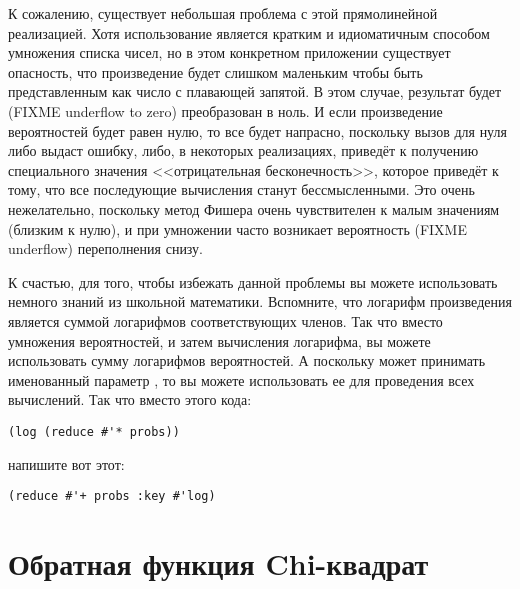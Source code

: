 К сожалению, существует небольшая проблема с этой прямолинейной реализацией.  Хотя
использование  является кратким и идиоматичным способом умножения списка
чисел, но в этом конкретном приложении существует опасность, что произведение будет
слишком маленьким чтобы быть представленным как число с плавающей запятой. В этом случае,
результат будет (FIXME underflow to zero) преобразован в ноль.  И если произведение
вероятностей будет равен нулю, то все будет напрасно, поскольку вызов  для нуля
либо выдаст ошибку, либо, в некоторых реализациях, приведёт к получению специального
значения <<отрицательная бесконечность>>, которое приведёт к тому, что все последующие
вычисления станут бессмысленными.  Это очень нежелательно, поскольку метод Фишера очень
чувствителен к малым значениям (близким к нулю), и при умножении часто возникает
вероятность (FIXME underflow) переполнения снизу.

К счастью, для того, чтобы избежать данной проблемы вы можете использовать немного знаний
из школьной математики.  Вспомните, что логарифм произведения является суммой логарифмов
соответствующих членов.  Так что вместо умножения вероятностей, и затем вычисления
логарифма, вы можете использовать сумму логарифмов вероятностей.  А поскольку
 может принимать именованный параметр , то вы можете использовать
ее для проведения всех вычислений.  Так что вместо этого кода:

\begin{lstlisting}
(log (reduce #'* probs))
\end{lstlisting}

напишите вот этот:

\begin{lstlisting}
(reduce #'+ probs :key #'log)
\end{lstlisting}

\section{Обратная функция Chi-квадрат}

